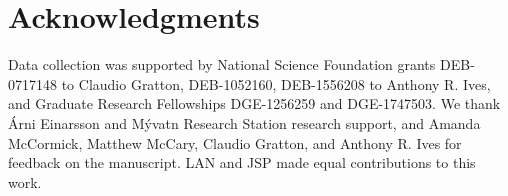 \documentclass[12pt]{article}
\begin{document}
























\section*{Acknowledgments}

Data collection was supported by National Science Foundation grants
DEB-0717148 to Claudio Gratton, DEB-1052160, DEB-1556208 to Anthony R. Ives,
and Graduate Research Fellowships DGE-1256259 and DGE-1747503.
We thank \'{A}rni Einarsson and M\'{y}vatn Research Station research support,
and Amanda McCormick, Matthew McCary, Claudio Gratton, and Anthony R. Ives 
for feedback on the manuscript. LAN and JSP made equal contributions to this work.
\end{document}
